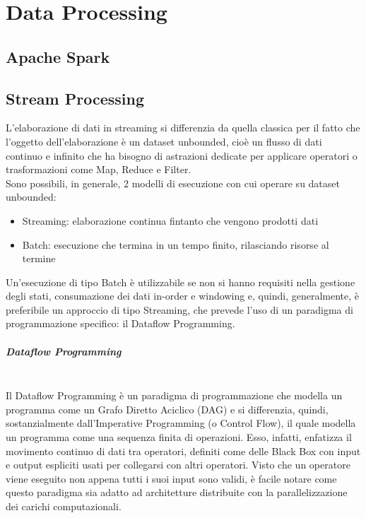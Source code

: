 \chapter{Data Processing}

\section{Apache Spark} \label{Spark}

\section{Stream Processing} \label{StreamProc}

L'elaborazione di dati in streaming si differenzia da quella classica per il fatto che l'oggetto dell'elaborazione è un dataset unbounded, cioè un flusso di dati continuo e infinito che ha bisogno di astrazioni dedicate per applicare operatori o trasformazioni come Map, Reduce e Filter. \\

Sono possibili, in generale, 2 modelli di esecuzione con cui operare su dataset unbounded:

\begin{itemize}
	\item Streaming: elaborazione continua fintanto che vengono prodotti dati
	\item Batch: esecuzione che termina in un tempo finito, rilasciando risorse al termine
\end{itemize}

Un'esecuzione di tipo Batch è utilizzabile se non si hanno requisiti nella gestione degli stati, consumazione dei dati in-order e windowing e, quindi, generalmente, è preferibile un approccio di tipo Streaming, che prevede l'uso di un paradigma di programmazione specifico: il Dataflow Programming.

\paragraph{Dataflow Programming}  \label{DataflowProg} ~\\

Il Dataflow Programming è un paradigma di programmazione che modella un programma come un Grafo Diretto Aciclico (DAG) e si differenzia, quindi, sostanzialmente dall'Imperative Programming (o Control Flow), il quale modella un programma come una sequenza finita di operazioni. Esso, infatti, enfatizza il movimento continuo di dati tra operatori, definiti come delle Black Box con input e output espliciti usati per collegarsi con altri operatori. Visto che un operatore viene eseguito non appena tutti i suoi input sono validi, è facile notare come questo paradigma sia adatto ad architetture distribuite con la parallelizzazione dei carichi computazionali.


